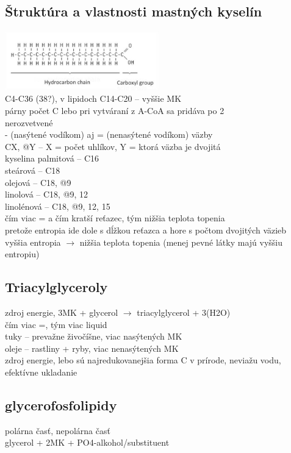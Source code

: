 \subsection*{Štruktúra a vlastnosti mastných kyselín}

\includegraphics[width=0.5\textwidth]{images/fatty_acid}
\\
C4-C36 (38?), v lipidoch C14-C20 -- vyššie MK\\
párny počet C lebo pri vytváraní z A-CoA sa pridáva po 2\\
nerozvetvené\\
- (nasýtené vodíkom) aj = (nenasýtené vodíkom) väzby\\
CX, @Y -- X = počet uhlíkov, Y = ktorá väzba je dvojitá\\
\tab kyselina palmitová -- C16\\
\tab steárová -- C18\\
\tab olejová -- C18, @9\\
\tab linolová -- C18, @9, 12 \\
\tab linolénová -- C18, @9, 12, 15\\
čím viac = a čím kratší reťazec, tým nižšia teplota topenia\\
\tab pretože entropia ide dole s dĺžkou reťazca a hore s počtom dvojitých väzieb\\
\tab vyššia entropia $\rightarrow$ nižšia teplota topenia (menej pevné látky majú vyššiu entropiu)\\
\subsection*{Triacylglyceroly}
zdroj energie, 3MK + glycerol $\rightarrow$ triacylglycerol + 3(H2O)\\
čím viac =, tým viac liquid\\
tuky -- prevažne živočíšne, viac nasýtených MK\\
oleje -- rastliny + ryby, viac nenasýtených MK\\
zdroj energie, lebo sú najredukovanejšia forma C v prírode, neviažu vodu, efektívne ukladanie\\
\subsection*{glycerofosfolipidy}
polárna časť, nepolárna časť\\
glycerol + 2MK + PO4-alkohol/substituent\\

